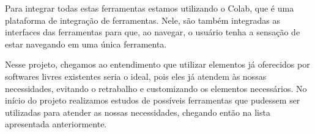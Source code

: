 Para integrar todas estas ferramentas estamos utilizando o Colab, que é uma plataforma de integração de ferramentas. Nele, são também integradas as interfaces das ferramentas para que, ao navegar, o usuário tenha a sensação de estar navegando em uma única ferramenta.

Nesse projeto, chegamos ao entendimento que utilizar elementos já oferecidos por softwares livres existentes seria o ideal, pois eles já atendem às nossas necessidades, evitando o retrabalho e customizando os elementos necessários. No início do projeto realizamos estudos de possíveis ferramentas que pudessem ser utilizadas para atender as nossas necessidades, chegando então na lista apresentada anteriormente.  
